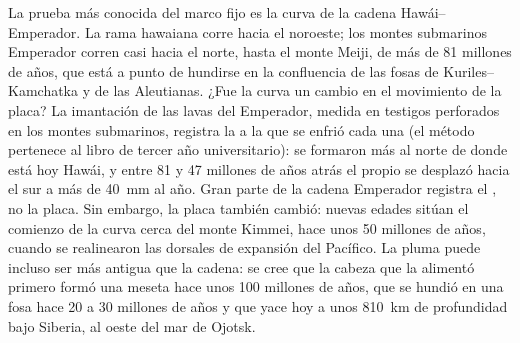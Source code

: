 La prueba más conocida del marco fijo es la curva de la cadena Hawái--Emperador. La rama hawaiana corre hacia el noroeste; los montes submarinos
Emperador corren casi hacia el norte, hasta el monte Meiji, de más de 81 millones de años, que está a punto de hundirse en la confluencia de las fosas
de Kuriles--Kamchatka y de las Aleutianas. ¿Fue la curva un cambio en el movimiento de la placa? La imantación de las lavas del Emperador, medida en
testigos perforados en los montes submarinos, registra la  a la que se enfrió cada una (el método pertenece al libro de tercer año universitario):
se formaron más al norte de donde está hoy Hawái, y entre 81 y 47 millones de años atrás el propio  se desplazó hacia el sur a más de
\qty{40}{mm} al año. Gran parte de la cadena Emperador registra el , no la placa. Sin embargo, la placa también cambió: nuevas edades sitúan
el comienzo de la curva cerca del monte Kimmei, hace unos 50 millones de años, cuando se realinearon las dorsales de expansión del Pacífico. La pluma puede
incluso ser más antigua que la cadena: se cree que la cabeza que la alimentó primero formó una meseta hace unos 100 millones de años, que se hundió en una
fosa hace 20 a 30 millones de años y que yace hoy a unos \qty{810}{km} de profundidad bajo Siberia, al oeste del mar de Ojotsk.

